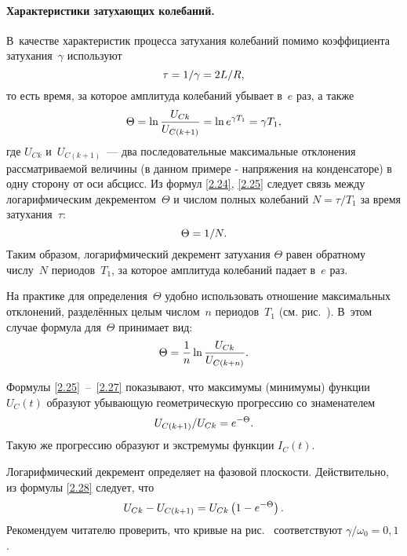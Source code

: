 \paragraph{Характеристики затухающих колебаний.}
В~качестве характеристик процесса затухания колебаний помимо коэффициента
затухания~$\gamma$ используют 
\begin{equation}\eqmark{2.24}
	\tau=1/\gamma=2L/R,
\end{equation}
то есть время, за которое амплитуда колебаний убывает в~$e$ раз, а также
\begin{equation}\eqmark{2.25}
	\Theta=\ln\dfrac{U_{Ck}}{U_{C(k+1)}}=\ln e^{\gamma T_1}=\gamma T_1,
\end{equation}
где $U_{Ck}$ и~$U_{C(k+1)}$~--- два последовательные максимальные отклонения
рассматриваемой величины (в данном примере - напряжения на конденсаторе) в одну
сторону от оси абсцисс. Из формул \eqref{2.24}, \eqref{2.25} следует связь между
логарифмическим декрементом~$\Theta$ и числом полных колебаний $N=\tau/T_1$ за
время затухания~$\tau$:
\begin{equation}\eqmark{2.26}
\Theta=1/N.
\end{equation}
Таким образом, логарифмический декремент затухания $\Theta$ равен обратному
числу~$N$ периодов~$T_1$, за которое амплитуда колебаний падает в~$e$ раз.

На практике для определения~$\Theta$ удобно использовать отношение максимальных
отклонений, разделённых целым числом~$n$ периодов~$T_1$ (см.
рис.~). В~этом случае формула для~$\Theta$ принимает вид:
\begin{equation}\eqmark{2.27}
\Theta=\dfrac{1}{n}\ln\dfrac{U_{Ck}}{U_{C(k+n)}}.
\end{equation}

Формулы \eqref{2.25}~--~\eqref{2.27} показывают, что максимумы (минимумы)
функции $U_C(t)$ образуют убывающую геометрическую прогрессию со знаменателем
\begin{equation}\eqmark{2.28}
U_{C(k+1)}/U_{Ck}=e^{-\Theta}.
\end{equation}
Такую же прогрессию образуют и экстремумы функции $I_C(t)$.

Логарифмический декремент определяет  на фазовой плоскости. Действительно, из формулы \eqref{2.28} следует,
что
\begin{equation}\eqmark{2.29}
	U_{Ck}-U_{C(k+1)}=U_{Ck}\left(1-e^{-\Theta}\right).
\end{equation}
Рекомендуем читателю проверить, что кривые на рис.~ соответствуют
$\gamma/\omega_0=0,1$.

